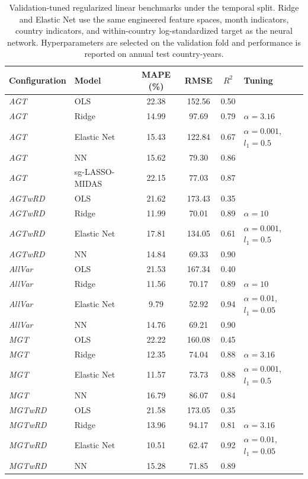 \begin{table}[!htb]
\centering
\caption{Validation-tuned regularized linear benchmarks under the temporal split. Ridge and Elastic Net use the same engineered feature spaces, month indicators, country indicators, and within-country log-standardized target as the neural network. Hyperparameters are selected on the validation fold and performance is reported on annual test country-years.}
\label{tab:regularized_linear_benchmarks}
\begin{tabular}{l l c c c l}
\toprule
Configuration & Model & MAPE (\%) & RMSE & $R^2$ & Tuning \\
\midrule
\textit{AGT} & OLS & 22.38 & 152.56 & 0.50 &  \\
\textit{AGT} & Ridge & 14.99 & 97.69 & 0.79 & $\alpha=3.16$ \\
\textit{AGT} & Elastic Net & 15.43 & 122.84 & 0.67 & $\alpha=0.001$, $l_1=0.5$ \\
\textit{AGT} & NN & 15.62 & 79.30 & 0.86 &  \\
\textit{AGT} & sg-LASSO-MIDAS & 22.15 & 77.03 & 0.87 &  \\
\textit{AGTwRD} & OLS & 21.62 & 173.43 & 0.35 &  \\
\textit{AGTwRD} & Ridge & 11.99 & 70.01 & 0.89 & $\alpha=10$ \\
\textit{AGTwRD} & Elastic Net & 17.81 & 134.05 & 0.61 & $\alpha=0.001$, $l_1=0.5$ \\
\textit{AGTwRD} & NN & 14.84 & 69.33 & 0.90 &  \\
\textit{AllVar} & OLS & 21.53 & 167.34 & 0.40 &  \\
\textit{AllVar} & Ridge & 11.56 & 70.17 & 0.89 & $\alpha=10$ \\
\textit{AllVar} & Elastic Net & 9.79 & 52.92 & 0.94 & $\alpha=0.01$, $l_1=0.05$ \\
\textit{AllVar} & NN & 14.76 & 69.21 & 0.90 &  \\
\textit{MGT} & OLS & 22.22 & 160.08 & 0.45 &  \\
\textit{MGT} & Ridge & 12.35 & 74.04 & 0.88 & $\alpha=3.16$ \\
\textit{MGT} & Elastic Net & 11.57 & 73.73 & 0.88 & $\alpha=0.001$, $l_1=0.5$ \\
\textit{MGT} & NN & 16.79 & 86.07 & 0.84 &  \\
\textit{MGTwRD} & OLS & 21.58 & 173.05 & 0.35 &  \\
\textit{MGTwRD} & Ridge & 13.96 & 94.17 & 0.81 & $\alpha=3.16$ \\
\textit{MGTwRD} & Elastic Net & 10.51 & 62.47 & 0.92 & $\alpha=0.01$, $l_1=0.05$ \\
\textit{MGTwRD} & NN & 15.28 & 71.85 & 0.89 &  \\
\bottomrule
\end{tabular}
\end{table}
